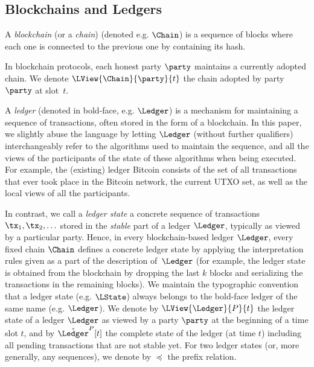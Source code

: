 \subsection{Blockchains and Ledgers}
A \emph{blockchain} (or a \emph{chain}) (denoted e.g. $\Chain$)  is a sequence
of blocks where each one is connected to the previous one by containing its
hash.

In blockchain protocols, each honest party $\party$ maintains a currently
adopted chain. We denote $\LView{\Chain}{\party}{t}$ the chain adopted by party
$\party$ at slot~$t$.

A \emph{ledger} (denoted in bold-face, e.g. $\Ledger$) is a mechanism for
maintaining a sequence of transactions, often stored in the form of a
blockchain.  In this paper, we slightly abuse the language by letting $\Ledger$
(without further qualifiers) interchangeably refer to the algorithms used to
maintain the sequence, and all the views of the participants of the state of
these algorithms when being executed.  For example, the (existing) ledger
Bitcoin consists of the set of all transactions that ever took place in the
Bitcoin network, %
the current UTXO set, as well as the
local views of all the participants.

In contrast, we call a \emph{ledger state}
a concrete sequence of transactions
$\tx_1,\tx_2, \ldots$ stored in the \emph{stable} part of a ledger $\Ledger$, typically as viewed by a
particular party.
Hence, in every blockchain-based ledger $\Ledger$, every fixed
chain $\Chain$ defines a concrete ledger state %
by applying  the interpretation rules given as a part of the description
of~$\Ledger$ (for example, the ledger state is obtained from the
blockchain by dropping the last $k$ blocks and serializing the transactions in
the remaining blocks).
We maintain the typographic convention that a ledger state (e.g. $\LState$) always
belongs to the bold-face ledger of the same name (e.g. $\Ledger$).
We denote by $\LView{\Ledger}{P}{t}$ the ledger state of a ledger $\Ledger$ as viewed by a party
$\party$ at the beginning of a time slot $t$,
and by $\check{\Ledger}^P[t]$ the complete state of the ledger (at time
$t$) including all
pending transactions that are not stable yet.
For two ledger states (or, more generally, any sequences), we denote by
$\preceq$ the prefix relation.

